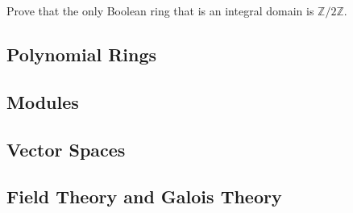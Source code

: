   \begin{exercise}[Dummit 7.1.16]
    Prove that the only Boolean ring that is an integral domain is $\mathbb{Z}/2\mathbb{Z}$. 
  \end{exercise}
  \begin{solution}
    
  \end{solution}

\subsection{Polynomial Rings}

\subsection{Modules}

\subsection{Vector Spaces}

\subsection{Field Theory and Galois Theory}

